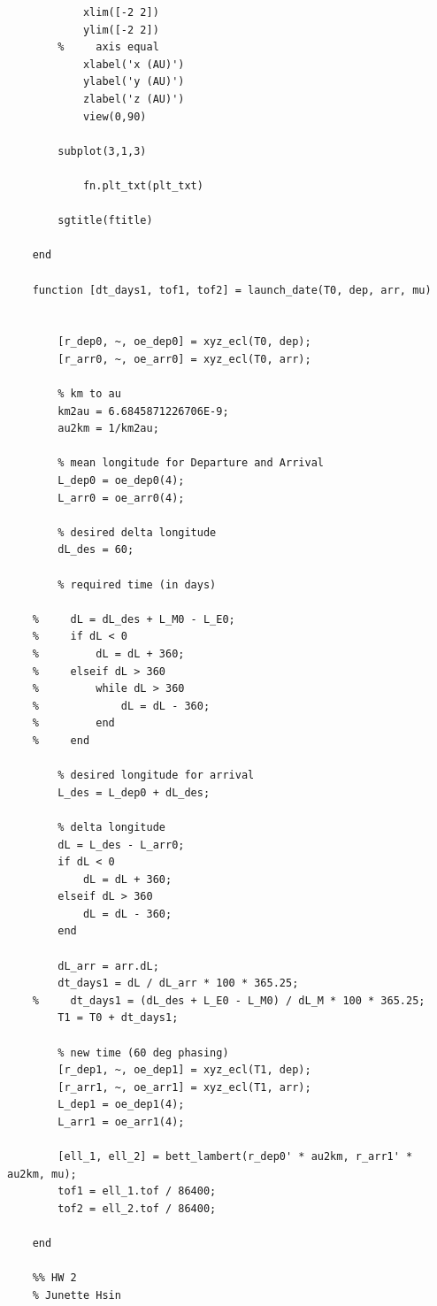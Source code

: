 \documentclass[conf]{new-aiaa}
\begin{document}
\begin{lstlisting}
            xlim([-2 2])
            ylim([-2 2])
        %     axis equal 
            xlabel('x (AU)') 
            ylabel('y (AU)') 
            zlabel('z (AU)') 
            view(0,90)
            
        subplot(3,1,3) 
        
            fn.plt_txt(plt_txt) 
    
        sgtitle(ftitle)
    
    end 
    
    function [dt_days1, tof1, tof2] = launch_date(T0, dep, arr, mu)
    
    
        [r_dep0, ~, oe_dep0] = xyz_ecl(T0, dep); 
        [r_arr0, ~, oe_arr0] = xyz_ecl(T0, arr); 
    
        % km to au 
        km2au = 6.6845871226706E-9; 
        au2km = 1/km2au; 
    
        % mean longitude for Departure and Arrival
        L_dep0 = oe_dep0(4); 
        L_arr0 = oe_arr0(4); 
    
        % desired delta longitude 
        dL_des = 60; 
    
        % required time (in days) 
    
    %     dL = dL_des + L_M0 - L_E0; 
    %     if dL < 0
    %         dL = dL + 360; 
    %     elseif dL > 360 
    %         while dL > 360 
    %             dL = dL - 360; 
    %         end 
    %     end 
        
        % desired longitude for arrival 
        L_des = L_dep0 + dL_des; 
        
        % delta longitude 
        dL = L_des - L_arr0; 
        if dL < 0 
            dL = dL + 360; 
        elseif dL > 360 
            dL = dL - 360; 
        end
        
        dL_arr = arr.dL;
        dt_days1 = dL / dL_arr * 100 * 365.25; 
    %     dt_days1 = (dL_des + L_E0 - L_M0) / dL_M * 100 * 365.25; 
        T1 = T0 + dt_days1; 
    
        % new time (60 deg phasing) 
        [r_dep1, ~, oe_dep1] = xyz_ecl(T1, dep); 
        [r_arr1, ~, oe_arr1] = xyz_ecl(T1, arr); 
        L_dep1 = oe_dep1(4); 
        L_arr1 = oe_arr1(4); 
    
        [ell_1, ell_2] = bett_lambert(r_dep0' * au2km, r_arr1' * au2km, mu); 
        tof1 = ell_1.tof / 86400; 
        tof2 = ell_2.tof / 86400; 
    
    end 
    
    %% HW 2 
    % Junette Hsin 
    

\end{lstlisting}
\end{document}
